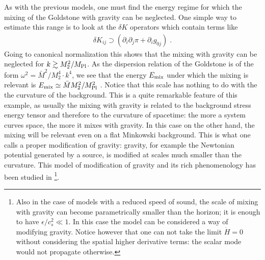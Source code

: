 \documentclass[12pt,letterpaper]{article}
\def\be{\begin{eqnarray}}
\def\ee{\end{eqnarray}}
\begin{document}
{As with the previous models, one must find the energy regime for which the mixing of the Goldstone with gravity can be neglected.  One simple way to estimate this range is to look at the $\delta K$ operators which contain terms like
\be
\delta K_{ij} \supset (\partial_i\partial_j \pi +\partial_i g_{0j}) \;.
\ee 
Going to canonical normalization this shows that the mixing with gravity can be neglected for 
$k \gtrsim M_2^2/M_{\rm Pl}$. As the dispersion relation of the Goldstone is of the form $\omega^2 = \bar M^2/M_2^4 \cdot k^4$, we see that the energy $E_{\rm mix}$ under which the mixing is relevant is 
$E_{\rm mix} \simeq \bar M M_2^2/M_{\rm Pl}^2$ \cite{Arkani-Hamed:2003uy}.
Notice that this scale has nothing to do with the the curvature of the
background. This is a quite remarkable feature of this example, as
usually the mixing with gravity is related to the background stress
energy tensor and therefore to the curvature of spacetime: the more a
system curves space, the more it mixes with gravity. In this case on
the other hand, the mixing will be relevant even on a flat Minkowski
background. This is what one calls a proper modification of gravity:
gravity, for example the Newtonian potential generated by a source, is
modified at scales much smaller than the curvature. This model of
modification of gravity and its rich phenomenology has been studied in
\cite{Arkani-Hamed:2003uy} \footnote{Also in the case of models with a
  reduced speed of sound, the scale of mixing with gravity can
  become parametrically smaller than the horizon; it is enough to have
  $\epsilon/c_s^2 \ll 1$. In this case the model can be considered a
  way of modifying gravity. Notice however that one can not take the
  limit $\dot H = 0$ without considering the spatial higher derivative
  terms: the scalar mode would not propagate otherwise.}.

}
\end{document}
